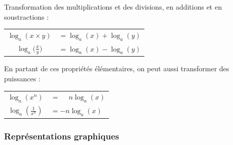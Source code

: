 \documentclass[a4paper, twoside]{article}
\begin{document}
	Transformation des multiplications et des divisions, en additions et en soustractions :

	\begin{center}
	\begin{LARGE}
	\begin{tabular}{cl}

		$ \log_a ( x \times y )         $ & $= \log_a (x) + \log_a (y) $ \\
		\vspace{0.3cm}
		$ \log_a \Big( \frac{x}{y} \Big)$ & $= \log_a (x) - \log_a (y) $ \\
		
	\end{tabular}
	\end{LARGE}
	\end{center}



	En partant de ces propriétés élémentaires, on peut aussi transformer des puissances :

	\begin{center}
	\begin{LARGE}
	\begin{tabular}{cl}

		$ \log_a ( x^n )                       $ & $= \phantom{-}n \log_a (x) $ \\
		\vspace{0.3cm}
		$ \log_a \left( \frac{1}{x^{n}} \right)$ & $= - n \log_a (x) $ \\
		
	\end{tabular}
	\end{LARGE}
	\end{center}

	\let\thefootnote\relax{}


		
	\subsubsection*{Représentations graphiques}
\end{document}

